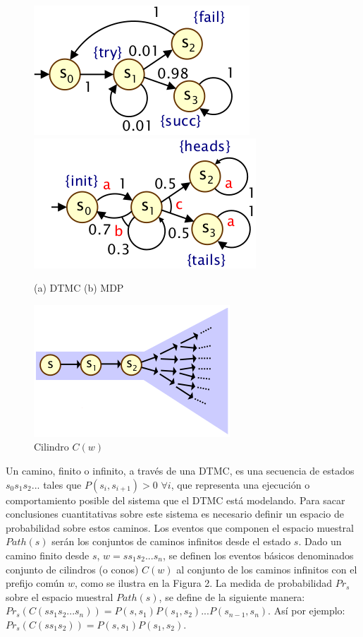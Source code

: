 \documentclass[11pt]{article}
\begin{document}
\begin{figure}[h]
	\includegraphics[scale=0.6]{DTMC.png} \includegraphics[scale=0.6]{MDP.png}
	\centering
	\caption{(a) DTMC \hspace{2cm} (b) MDP}
\end{figure}

\begin{figure}[h]
	\includegraphics[scale=0.6]{cone.png}
	\centering
	\caption{Cilindro $C(w)$}
\end{figure}

Un camino, finito o infinito, a trav\'es de una DTMC, es una secuencia de estados $s_0s_1s_2...$ tales que $P(s_i, s_{i+1}) > 0$ $\forall i$, que representa una ejecuci\'on o comportamiento posible del sistema que el DTMC est\'a modelando. Para sacar conclusiones cuantitativas sobre este sistema es necesario definir un espacio de probabilidad sobre estos caminos. Los eventos que componen el espacio muestral $Path(s)$ ser\'an los conjuntos de caminos infinitos desde el estado $s$.  Dado un camino finito desde $s$, $w = ss_1s_2...s_n$, se definen los eventos b\'asicos denominados conjunto de cilindros (o conos) $C(w)$ al conjunto de los caminos infinitos con el prefijo com\'un $w$, como se ilustra en la Figura 2. La medida de probabilidad $Pr_s$ sobre el espacio muestral $Path(s)$, se define de la siguiente manera: $Pr_s(C(ss_1s_2...s_n)) = P(s,s_1)P(s_1,s_2)...P(s_{n-1}, s_n)$. As\'i por ejemplo: $Pr_s(C(ss_1s_2)) = P(s,s_1)P(s_1,s_2)$. \\
\end{document}
